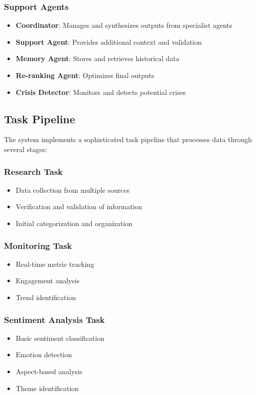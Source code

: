 \subsubsection{Support Agents}
\begin{itemize}
    \item \textbf{Coordinator}: Manages and synthesizes outputs from specialist agents
    \item \textbf{Support Agent}: Provides additional context and validation
    \item \textbf{Memory Agent}: Stores and retrieves historical data
    \item \textbf{Re-ranking Agent}: Optimizes final outputs
    \item \textbf{Crisis Detector}: Monitors and detects potential crises
\end{itemize}

\subsection{Task Pipeline}
The system implements a sophisticated task pipeline that processes data through several stages:

\subsubsection{Research Task}
\begin{itemize}
    \item Data collection from multiple sources
    \item Verification and validation of information
    \item Initial categorization and organization
\end{itemize}

\subsubsection{Monitoring Task}
\begin{itemize}
    \item Real-time metric tracking
    \item Engagement analysis
    \item Trend identification
\end{itemize}

\subsubsection{Sentiment Analysis Task}
\begin{itemize}
    \item Basic sentiment classification
    \item Emotion detection
    \item Aspect-based analysis
    \item Theme identification
\end{itemize}

